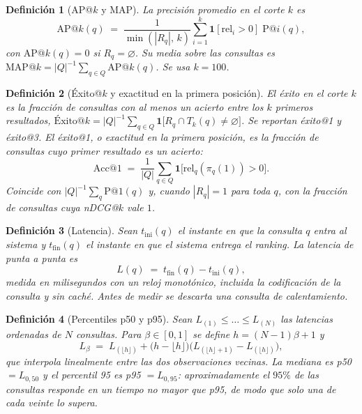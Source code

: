 \documentclass[11pt,letterpaper]{article}
\newtheorem{definition}{Definición}[section]
\numberwithin{equation}{section}
\begin{document}
\begin{definition}[AP@$k$ y MAP]
\label{def:ap}
La precisión promedio en el corte $k$ es
\begin{equation}
\mathrm{AP@}k(q) \;=\; \frac{1}{\min(|R_q|,\,k)}\sum_{i=1}^{k}\mathbf{1}[\mathrm{rel}_i>0]\;\mathrm{P@}i(q),
\label{eq:g-ap}
\end{equation}
con $\mathrm{AP@}k(q)=0$ si $R_q=\varnothing$. Su media sobre las consultas es $\mathrm{MAP@}k=|Q|^{-1}\sum_{q\in Q}\mathrm{AP@}k(q)$. Se usa $k=100$.
\end{definition}

\begin{definition}[Éxito@$k$ y exactitud en la primera posición]
\label{def:acc1}
El éxito en el corte $k$ es la fracción de consultas con al menos un acierto entre los $k$ primeros resultados, $\text{Éxito@}k=|Q|^{-1}\sum_{q\in Q}\mathbf{1}\big[R_q\cap T_k(q)\neq\varnothing\big]$. Se reportan éxito@1 y éxito@3. El éxito@1, o exactitud en la primera posición, es la fracción de consultas cuyo primer resultado es un acierto:
\begin{equation}
\mathrm{Acc@}1 \;=\; \frac{1}{|Q|}\sum_{q\in Q}\mathbf{1}\big[\mathrm{rel}_q(\pi_q(1))>0\big] .
\label{eq:g-acc1}
\end{equation}
Coincide con $|Q|^{-1}\sum_{q}\mathrm{P@}1(q)$ y, cuando $|R_q|=1$ para toda $q$, con la fracción de consultas cuya nDCG@$k$ vale $1$.
\end{definition}

\begin{definition}[Latencia]
\label{def:latencia}
Sean $t_{\text{ini}}(q)$ el instante en que la consulta $q$ entra al sistema y $t_{\text{fin}}(q)$ el instante en que el sistema entrega el \emph{ranking}. La latencia de punta a punta es
\begin{equation}
L(q) \;=\; t_{\text{fin}}(q)-t_{\text{ini}}(q),
\label{eq:g-latencia}
\end{equation}
medida en milisegundos con un reloj monotónico, incluida la codificación de la consulta y sin caché. Antes de medir se descarta una consulta de calentamiento.
\end{definition}

\begin{definition}[Percentiles p50 y p95]
\label{def:percentil}
Sean $L_{(1)}\leq\dots\leq L_{(N)}$ las latencias ordenadas de $N$ consultas. Para $\beta\in[0,1]$ se define $h=(N-1)\beta+1$ y
\begin{equation}
L_{\beta} \;=\; L_{(\lfloor h\rfloor)} + \big(h-\lfloor h\rfloor\big)\big(L_{(\lfloor h\rfloor+1)}-L_{(\lfloor h\rfloor)}\big),
\label{eq:g-percentil}
\end{equation}
que interpola linealmente entre las dos observaciones vecinas. La mediana es p50 $=L_{0,50}$ y el percentil 95 es p95 $=L_{0,95}$: aproximadamente el $95\%$ de las consultas responde en un tiempo no mayor que p95, de modo que solo una de cada veinte lo supera.
\end{definition}
\end{document}
